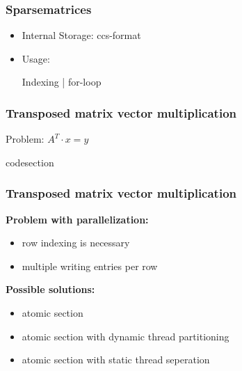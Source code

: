 \documentclass{beamer}
\begin{document}

\begin{frame}
\frametitle{Sparsematrices}
\begin{itemize}
\item Internal Storage: ccs-format
\item Usage:
\begin{block}{Indexing | for-loop}
\codeA
\end{block}
\end{itemize}
\end{frame}



\begin{frame}
\frametitle{Transposed matrix vector multiplication}
Problem: $A^T\cdot x=y$
\begin{block}{codesection}
\codeB
\end{block}
\end{frame}


\begin{frame}
\frametitle{Transposed matrix vector multiplication}
\textbf{Problem with parallelization:}
\begin{itemize}
\item row indexing is necessary
\item multiple writing entries per row
\end{itemize}

\textbf{Possible solutions:}
\begin{itemize}
\item atomic section
\item atomic section with dynamic thread partitioning \codeC
\item atomic section with static thread seperation
\end{itemize}
\end{frame}
\end{document}
